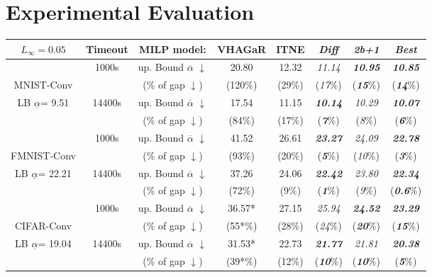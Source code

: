 \section{Experimental Evaluation}

\begin{table}[b!]
	\centering
	\begin{tabular}{||c c||c c c c c ||c|}\hline
	$L_\infty=0.05$ & Timeout & MILP model: & VHAGaR &  ITNE & {\em Diff} & {\em 2b+1} & {\em Best} \\\hline \hline
	  & 1000s & up. Bound $\overline{\alpha}$ $\downarrow$ &  20.80 & 12.32 & {\em 11.14} & {\em \bf 10.95} & {\bf \em 10.85}
    \\
	MNIST-Conv & & ($\%$ of gap $\downarrow$) & (120$\%$) & (29$\%$) & ({\em 17}$\%$) & ({\em \bf 15}$\%$) & ({\bf \em 14}$\%$)
	\\
	 LB $\underline{\alpha}$= 9.51 & 14400s & up. Bound $\overline{\alpha}$ $\downarrow$ & 17.54 & 11.15 & {\bf \em 10.14} & {\em 10.29} & {\bf \em 10.07}
    \\
	  & & ($\%$ of gap $\downarrow$) &  (84$\%$) & (17$\%$) & ({\bf \em 7}$\%$) & ({\em 8}$\%$) & ({\bf \em 6}$\%$) 
    \\\hline

	
	& 1000s & up. Bound $\overline{\alpha}$ $\downarrow$ & 41.52 & 26.61 & {\bf \em 23.27}  & {\em 24.09} & {\bf \em 22.78}
    \\
	FMNIST-Conv & & ($\%$ of gap $\downarrow$) & (93$\%$) & (20$\%$) & ({\bf \em 5}$\%$) & ({\em 10}$\%$) & ({\bf \em 3}$\%$)
    \\


	LB $\underline{\alpha}$= 22.21 & 14400s & up. Bound $\overline{\alpha}$ $\downarrow$ & 37.26 & 24.06 & {\bf \em 22.42 } & {\em  23.80} & {\bf \em 22.34}
    \\
	 & & ($\%$ of gap $\downarrow$) & (72$\%$) &  (9$\%$) & ({\bf \em 1}$\%$) & ({\em 9}$\%$) & ({\bf \em 0.6}$\%$)
    \\\hline
	

	& 1000s  & up. Bound $\overline{\alpha}$ $\downarrow$ & 36.57* & 27.15 & 
	{\em 25.94} & {\bf \em 24.52}& {\bf \em 23.29}
    \\
	CIFAR-Conv & & ($\%$ of gap $\downarrow$) & (55*$\%$) & (28$\%$) & ({\em 24}$\%$) & ({\bf \em 20}$\%$) & ({\bf \em 15}$\%$)
	\\
    
	LB $\underline{\alpha}$= 19.04 & 14400s  & up. Bound $\overline{\alpha}$ $\downarrow$ & 31.53* & 22.73 & {\bf \em 21.77} & {\em 21.81} & {\bf \em 20.38}
    \\
	 & & ($\%$ of gap $\downarrow$) & (39*$\%$) & (12$\%$) & ({\bf \em 10}$\%$) & ({\bf \em 10}$\%$) & ({\bf \em 5}$\%$)
		\\\hline
    

\end{tabular}
\end{table}
